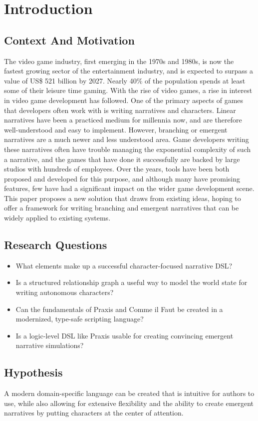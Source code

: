 \chapter{Introduction} \label{sec:Introduction}

\section{Context And Motivation} \label{sec:ContextAndMotivation}

The video game industry, first emerging in the 1970s and 1980s, is now the fastest
growing sector of the entertainment industry, and is expected to surpass a value of
US\$ 521 billion by 2027. Nearly 40\% of the population spends at least some of their
leisure time gaming. \cite{goh_unravelling_2023} With the rise of video games, a rise in interest in video game
development has followed. One of the primary aspects of games that developers
often work with is writing narratives and characters. Linear narratives have been
a practiced medium for millennia now, and are therefore well-understood and easy
to implement. However, branching or emergent narratives are a much newer and
less understood area. Game developers writing these narratives often have trouble
managing the exponential complexity of such a narrative, and the games that have
done it successfully are backed by large studios with hundreds of employees.
Over the years, tools have been both proposed and developed for this purpose, and
although many have promising features, few have had a significant impact on the wider
game development scene. This paper proposes a new solution that draws from existing
ideas, hoping to offer a framework for writing branching and emergent narratives that
can be widely applied to existing systems.

\section{Research Questions} \label{sec:ResearchQuestions}

\begin{itemize}
    \item What elements make up a successful character-focused narrative DSL?
    \item Is a structured relationship graph a useful way to model the world state for
    writing autonomous characters?
    \item Can the fundamentals of Praxis and Comme il Faut be created
    in a modernized, type-safe scripting language?
    \item Is a logic-level DSL like Praxis usable for creating convincing
    emergent narrative simulations?
\end{itemize}

\section{Hypothesis} \label{sec:Hypothesis}

A modern domain-specific language can be created that is intuitive for authors to
use, while also allowing for extensive flexibility and the ability to create emergent
narratives by putting characters at the center of attention.
